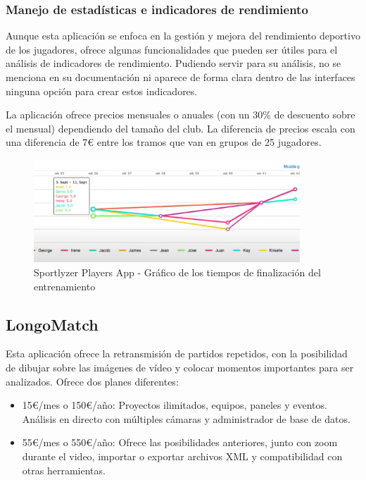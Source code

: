 \subsubsection{Manejo de estadísticas e indicadores de rendimiento}
Aunque esta aplicación se enfoca en la gestión y mejora del rendimiento deportivo de los jugadores, ofrece algunas funcionalidades que pueden ser útiles para el análisis de indicadores de rendimiento. Pudiendo servir para su análisis, no se menciona en su documentación ni aparece de forma clara dentro de las interfaces ninguna opción para crear estos indicadores.

La aplicación ofrece precios mensuales o anuales (con un 30\% de descuento sobre el mensual) dependiendo del tamaño del club. La diferencia de precios escala con una diferencia de 7€ entre los tramos que van en grupos de 25 jugadores.

\begin{figure}[h]
    \centering
    \includegraphics[width=10cm]{archivos/tfg_jorge/sportlyzer_graph_sesion_entrenamiento}
    \caption{Sportlyzer Players App - Gráfico de los tiempos de finalización del entrenamiento}\label{sistemass2}
\end{figure}


\subsection{LongoMatch}
Esta aplicación ofrece la retransmisión de partidos repetidos, con la posibilidad de dibujar sobre las imágenes de vídeo y colocar momentos importantes para ser analizados.
Ofrece dos planes diferentes:

\begin{itemize}
    \item 15€/mes o 150€/año: Proyectos ilimitados, equipos, paneles y eventos. Análisis en directo con múltiples cámaras y  administrador de base de datos.
    \item 55€/mes o 550€/año: Ofrece las posibilidades anteriores, junto con zoom durante el video, importar o exportar archivos XML y compatibilidad con otras herramientas.
\end{itemize}

